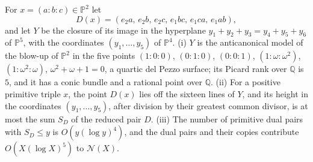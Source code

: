 \documentclass[10pt]{article}
\newcommand{\Q}{\mathbb{Q}}
\newcommand{\PP}{\mathbb{P}}
\newcommand{\N}{\mathcal{N}}
\begin{document}
\begin{proposition}\label{prop:delpezzo}
For $x=(a:b:c)\in\PP^2$ let
\[
  D(x)=(e_2a,\,e_2b,\,e_2c,\,e_1bc,\,e_1ca,\,e_1ab),
\]
and let $Y$ be the closure of its image in the hyperplane $y_1+y_2+y_3=y_4+y_5+y_6$ of $\PP^5$, with the coordinates $(y_1,\dots,y_5)$ of $\PP^4$.
\textup{(i)} $Y$ is the anticanonical model of the blow-up of $\PP^2$ in the five points $(1:0:0)$, $(0:1:0)$, $(0:0:1)$, $(1:\omega:\omega^2)$, $(1:\omega^2:\omega)$, $\omega^2+\omega+1=0$, a quartic del Pezzo surface; its Picard rank over $\Q$ is $5$, and it has a conic bundle and a rational point over $\Q$.
\textup{(ii)} For a positive primitive triple $x$, the point $D(x)$ lies off the sixteen lines of $Y$, and its height in the coordinates $(y_1,\dots,y_5)$, after division by their greatest common divisor, is at most the sum $S_D$ of the reduced pair $D$.
\textup{(iii)} The number of primitive dual pairs with $S_D\le y$ is $O(y(\log y)^4)$, and the dual pairs and their copies contribute $O(X(\log X)^5)$ to $\N(X)$.
\end{proposition}
\end{document}
